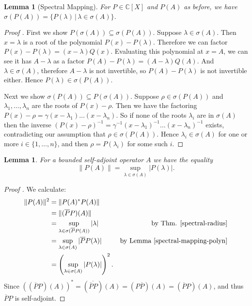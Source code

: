 \documentclass[12pt,oneside]{report}
\newtheorem{lem}[thm]{Lemma}
\begin{document}
\begin{lem}[Spectral Mapping]\label{spectral-mapping-polyn}
    For $P \in \mathbb{C}[X]$ and $P(A)$ as before, we have $\sigma(P(A)) = \{ P(\lambda) \, | \, \lambda \in \sigma(A) \}$.
\end{lem}
\begin{proof}[Proof \cite{Reed_Simon_1980}]
    First we show $P(\sigma(A)) \subseteq \sigma(P(A))$. Suppose $\lambda \in \sigma(A)$. Then $x = \lambda$ is a root of the polynomial $P(x) - P(\lambda)$. Therefore we can factor $P(x) - P(\lambda) = (x - \lambda)Q(x)$. Evaluating this polynomial at $x = A$, we can see it has $A - \lambda$ as a factor $P(A) - P(\lambda) = (A - \lambda)Q(A)$. And $\lambda \in \sigma(A)$, therefore $A - \lambda$ is not invertible, so $P(A) - P(\lambda)$ is not invertible either. Hence $P(\lambda) \in \sigma(P(A))$.

    Next we show $\sigma(P(A)) \subseteq P(\sigma(A))$. Suppose $\rho \in \sigma(P(A))$ and $\lambda_{1},\dots,\lambda_{n}$ are the roots of $P(x) - \rho$. Then we have the factoring $P(x) - \rho = \gamma(x - \lambda_{1})\dots(x - \lambda_{n})$. So if none of the roots $\lambda_{i}$ are in $\sigma(A)$ then the inverse $(P(x) - \rho)^{-1} = \gamma^{-1}(x - \lambda_{1})^{-1}\dots(x - \lambda_{n})^{-1}$ exists, contradicting our assumption that $\rho \in \sigma(P(A))$. Hence $\lambda_{i} \in \sigma(A)$ for one or more $i \in \{ 1,\dots,n \}$, and then $\rho = P(\lambda_{i})$ for some such $i$.
\end{proof}

\begin{lem}
    For a bounded self-adjoint operator $A$ we have the equality $$\|P(A)\| = \sup_{\lambda \in \sigma(A)} |P(\lambda)|.$$
\end{lem}
\begin{proof}[Proof \cite{Reed_Simon_1980}]
    We calculate:
    \begin{align*}
        \|P(A)\|^{2} &= \|P(A)^{*}P(A)\| \\
        &= \|(\overline{P}P)(A)\| \\
        &= \sup_{\lambda \in \sigma(\overline{P}P(A))} |\lambda| & \text{by Thm. \ref{spectral-radius}} \\
        &= \sup_{\lambda \in \sigma(A)} |\overline{P}P(\lambda)| & \text{by Lemma \ref{spectral-mapping-polyn}} \\
        &= \left( \sup_{\lambda \in \sigma(A)} |P(\lambda)| \right)^{2}.
    \end{align*}
    Since $((\overline{P}P)(A))^{*} = (\overline{\overline{P}P})(A) = (P\overline{P})(A) = (\overline{P}P)(A)$, and thus $\overline{P}P$ is self-adjoint.
\end{proof}
\end{document}
